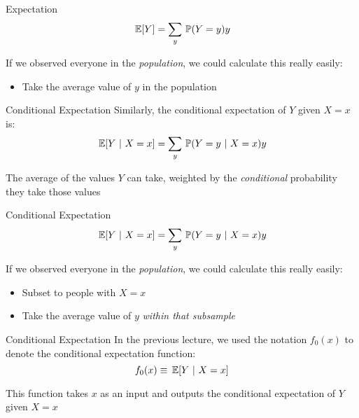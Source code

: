 \documentclass[aspectratio=169,t,11pt,table]{beamer}
\begin{document}
\begin{frame}{Expectation}
  \vspace*{-\bigskipamount}
  $$
    \expec{Y} = \sum_y \prob{Y = y} y 
  $$

  If we observed everyone in the \emph{population}, we could calculate this really easily:
  \begin{itemize}
    \item Take the average value of $y$ in the population
  \end{itemize}
\end{frame}
  
\begin{frame}{Conditional Expectation}
  Similarly, the \alert{conditional expectation} of $Y$ given $X = x$ is: 
  $$
    \expec{Y}{X = x} = \sum_y \prob{Y = y}{X = x} y 
  $$
  
  \bigskip
  The average of the values $Y$ can take, weighted by the \emph{conditional} probability they take those values
\end{frame}

\begin{frame}{Conditional Expectation}
  \vspace*{-\bigskipamount}
  $$
    \expec{Y}{X = x} = \sum_y \prob{Y = y}{X = x} y 
  $$

  If we observed everyone in the \emph{population}, we could calculate this really easily:
  \begin{itemize}
    \item Subset to people with $X = x$
    \item Take the average value of $y$ \emph{within that subsample}
  \end{itemize}
\end{frame}

\begin{frame}{Conditional Expectation}
  In the previous lecture, we used the notation $f_0(x)$ to denote the conditional expectation function:
  $$
    f_0(x) \equiv \expec{Y}{X = x}
  $$

  \bigskip
  This function takes $x$ as an input and outputs the conditional expectation of $Y$ given $X = x$
  

\end{frame}
\end{document}
